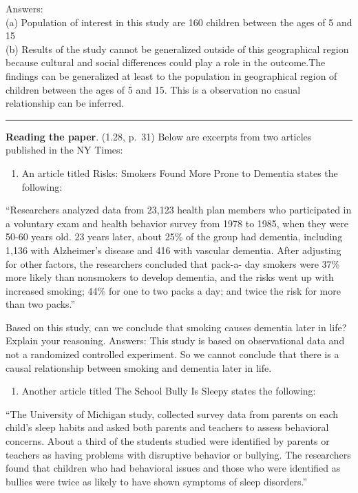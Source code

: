 \documentclass[
]{article}
\providecommand{\tightlist}{%
  \setlength{\itemsep}{0pt}\setlength{\parskip}{0pt}}
\begin{document}
Answers:\\
(a) Population of interest in this study are 160 children between the
ages of 5 and 15\\
(b) Results of the study cannot be generalized outside of this
geographical region because cultural and social differences could play a
role in the outcome.The findings can be generalized at least to the
population in geographical region of children between the ages of 5 and
15. This is a observation no casual relationship can be inferred.

\begin{center}\rule{0.5\linewidth}{0.5pt}\end{center}

\clearpage

\textbf{Reading the paper}. (1.28, p.~31) Below are excerpts from two
articles published in the NY Times:

\begin{enumerate}
\def\labelenumi{(\alph{enumi})}
\tightlist
\item
  An article titled Risks: Smokers Found More Prone to Dementia states
  the following:
\end{enumerate}

``Researchers analyzed data from 23,123 health plan members who
participated in a voluntary exam and health behavior survey from 1978 to
1985, when they were 50-60 years old. 23 years later, about 25\% of the
group had dementia, including 1,136 with Alzheimer's disease and 416
with vascular dementia. After adjusting for other factors, the
researchers concluded that pack-a- day smokers were 37\% more likely
than nonsmokers to develop dementia, and the risks went up with
increased smoking; 44\% for one to two packs a day; and twice the risk
for more than two packs.''

Based on this study, can we conclude that smoking causes dementia later
in life? Explain your reasoning. Answers: This study is based on
observational data and not a randomized controlled experiment. So we
cannot conclude that there is a causal relationship between smoking and
dementia later in life.

\begin{enumerate}
\def\labelenumi{(\alph{enumi})}
\setcounter{enumi}{1}
\tightlist
\item
  Another article titled The School Bully Is Sleepy states the
  following:
\end{enumerate}

``The University of Michigan study, collected survey data from parents
on each child's sleep habits and asked both parents and teachers to
assess behavioral concerns. About a third of the students studied were
identified by parents or teachers as having problems with disruptive
behavior or bullying. The researchers found that children who had
behavioral issues and those who were identified as bullies were twice as
likely to have shown symptoms of sleep disorders.''
\end{document}
